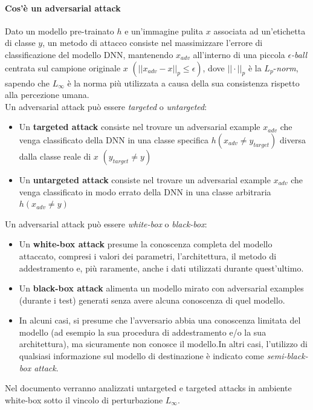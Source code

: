     \paragraph{Cos'è un adversarial attack}
    Dato un modello pre-trainato $h$ e un'immagine pulita $x$ associata ad un'etichetta di classe $y$, un metodo di attacco consiste nel massimizzare l'errore di classificazione del modello DNN, mantenendo $x_{adv}$ all'interno di una piccola \textit{$\epsilon$-ball} centrata sul campione originale $x$ $(||x_{adv}-x||_p \leq \epsilon)$, dove $||\cdot||_p$ è la $L_p$-\textit{norm}, sapendo che $L_\infty$ è la norma più utilizzata a causa della sua consistenza rispetto alla percezione umana.\\
    \newline
    Un adversarial attack può essere \textit{targeted} o \textit{untargeted}:
        \begin{itemize}
            \item Un \textbf{targeted attack} consiste nel trovare un adversarial example $x_{adv}$ che venga classificato della DNN in una classe specifica $h(x_{adv} \neq y_{target})$ diversa dalla classe reale di $x$ $(y_{target} \neq y)$
            \item Un \textbf{untargeted attack} consiste nel trovare un adversarial example $x_{adv}$ che venga classificato in modo errato della DNN in una classe arbitraria $h(x_{adv} \neq y)$
        \end{itemize}
    Un adversarial attack può essere \textit{white-box} o \textit{black-box}:
        \begin{itemize}
            \item Un \textbf{white-box attack} presume la conoscenza completa del modello attaccato, compresi i valori dei parametri, l'architettura, il metodo di addestramento e, più raramente, anche i dati utilizzati durante quest'ultimo.
            \item Un \textbf{black-box attack} alimenta un modello mirato con adversarial examples (durante i test) generati senza avere alcuna conoscenza di quel modello. 
            \item In alcuni casi, si presume che l'avversario abbia una conoscenza limitata del modello (ad esempio la sua procedura di addestramento e/o la sua architettura), ma sicuramente non conosce il modello.In altri casi, l'utilizzo di qualsiasi informazione sul modello di destinazione è indicato come \textit{semi-black-box attack}.
        \end{itemize}
    Nel documento verranno analizzati untargeted e targeted attacks in ambiente white-box sotto il vincolo di perturbazione $L_\infty$.\\ 
